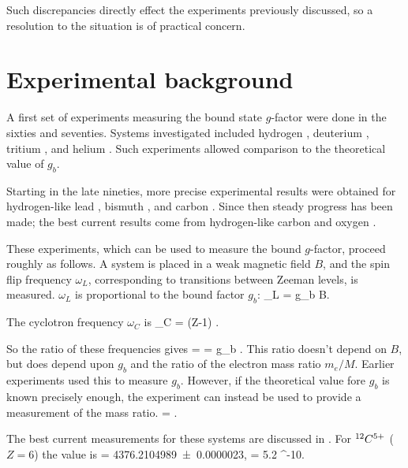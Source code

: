 Such discrepancies directly effect the experiments previously discussed, so a resolution to the situation is of practical concern.





\section{Experimental background}
A first set of experiments measuring the bound state $g$-factor were done in the sixties and seventies.  Systems investigated included hydrogen \cite{PhysRev.139.A19,PhysRevLett.39.602,PhysRevA.5.83}, deuterium \cite{PhysRevLett.28.1159}, tritium \cite{PhysRevA.9.1543}, and helium \cite{PhysRevLett.45.250}.  Such experiments allowed comparison to the theoretical value of $g_b$.

Starting in the late nineties, more precise experimental results were obtained for hydrogen-like lead \cite{PhysRevLett.81.4824}, bismuth \cite{GSI:1999}, and carbon \cite{PhysRevLett.85.5308}.  Since then steady progress has been made; the best current results come from hydrogen-like carbon \cite{PhysRevLett.85.5308,springerlink:10.1140/epjd/e2003-00012-2} and oxygen \cite{Verdu:November2002:1208-6045:1233,PhysRevLett.92.093002}.


These experiments, which can be used to measure the bound $g$-factor, proceed roughly as follows.  A system is placed in a weak magnetic field $B$, and the spin flip frequency $\omega_L$, corresponding to transitions between Zeeman levels, is measured.   $\omega_L$ is proportional to the bound factor $g_b$:
\beq
	\omega_L = g_b  B.
\eeq

The cyclotron frequency $\omega_C$ is
\beq
	\omega_C = (Z-1) .
\eeq

So the ratio of these frequencies gives
\beq
	 =  = 
	g_b  .
\eeq
This ratio doesn't depend on $B$, but does depend upon $g_b$ and the ratio of the electron mass ratio $m_e/M$.  Earlier experiments used this to measure $g_b$.  However, if the theoretical value fore $g_b$ is known precisely enough, the experiment can instead be used to provide a measurement of the mass ratio.  
\beq
	 =  .
\eeq


The best current measurements for these systems are discussed in \cite{2006IJMSp.251..152W}.  For $^{12}C^{5+}$ ($Z=6$) the value is
\beq
	  = \num{4376.2104989(23)},	\hspace{3em} 	\delta= 5.2 ^{-10}.
\eeq

